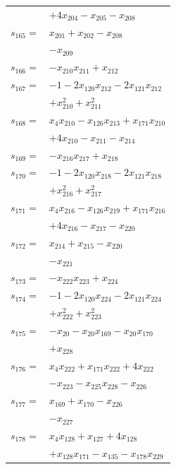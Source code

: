 \begin{longtable}{@{}r@{\;}l@{}}
 & \(\displaystyle +4x_{204} -x_{205} -x_{208}\) \\[3pt]
\(s_{165}=\) & \(\displaystyle x_{201} +x_{202} -x_{208}\) \\
 & \(\displaystyle -x_{209}\) \\[3pt]
\(s_{166}=\) & \(\displaystyle -x_{210}x_{211} +x_{212}\) \\[3pt]
\(s_{167}=\) & \(\displaystyle -1 -2x_{120}x_{212} -2x_{121}x_{212}\) \\
 & \(\displaystyle +x_{210}^{2} +x_{211}^{2}\) \\[3pt]
\(s_{168}=\) & \(\displaystyle x_{4}x_{210} -x_{126}x_{213} +x_{171}x_{210}\) \\
 & \(\displaystyle +4x_{210} -x_{211} -x_{214}\) \\[3pt]
\(s_{169}=\) & \(\displaystyle -x_{216}x_{217} +x_{218}\) \\[3pt]
\(s_{170}=\) & \(\displaystyle -1 -2x_{120}x_{218} -2x_{121}x_{218}\) \\
 & \(\displaystyle +x_{216}^{2} +x_{217}^{2}\) \\[3pt]
\(s_{171}=\) & \(\displaystyle x_{4}x_{216} -x_{126}x_{219} +x_{171}x_{216}\) \\
 & \(\displaystyle +4x_{216} -x_{217} -x_{220}\) \\[3pt]
\(s_{172}=\) & \(\displaystyle x_{214} +x_{215} -x_{220}\) \\
 & \(\displaystyle -x_{221}\) \\[3pt]
\(s_{173}=\) & \(\displaystyle -x_{222}x_{223} +x_{224}\) \\[3pt]
\(s_{174}=\) & \(\displaystyle -1 -2x_{120}x_{224} -2x_{121}x_{224}\) \\
 & \(\displaystyle +x_{222}^{2} +x_{223}^{2}\) \\[3pt]
\(s_{175}=\) & \(\displaystyle -x_{20} -x_{20}x_{169} -x_{20}x_{170}\) \\
 & \(\displaystyle +x_{228}\) \\[3pt]
\(s_{176}=\) & \(\displaystyle x_{4}x_{222} +x_{171}x_{222} +4x_{222}\) \\
 & \(\displaystyle -x_{223} -x_{225}x_{228} -x_{226}\) \\[3pt]
\(s_{177}=\) & \(\displaystyle x_{169} +x_{170} -x_{226}\) \\
 & \(\displaystyle -x_{227}\) \\[3pt]
\(s_{178}=\) & \(\displaystyle x_{4}x_{128} +x_{127} +4x_{128}\) \\
 & \(\displaystyle +x_{128}x_{171} -x_{135} -x_{178}x_{229}\) \\

\end{longtable}
